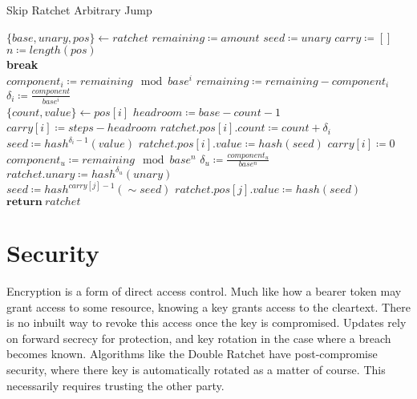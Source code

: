 \documentclass{article}
\begin{document}
	\begin{algorithm}
		\caption{Skip Ratchet Arbitrary Jump}
		\label{alg:jump}
		
		\begin{algorithmic}[1]
				\State $\{base, unary, pos\} \gets ratchet$
				\State $remaining \coloneqq amount$
				\State $seed \coloneqq unary$
				\State $carry \coloneqq []$
				\State $n \coloneqq length(pos)$
				\\
						\State \textbf{break}
					\EndIf
					\\
					\State $component_{i} \coloneqq remaining\mod{base^{i}}$
					\State $remaining \coloneqq remaining - component_{i}$
					\State $\delta_{i} \coloneqq \frac{component}{base^{i}}$ 
					\\
					\State $\{count, value\} \gets pos[i]$
					\State $headroom \coloneqq base - count - 1$
					\\
						\State $carry[i] \coloneqq steps - headroom$
					\Else
						\State $ratchet.pos[i].count \coloneqq count + \delta_{i}$
							\State $seed \coloneqq hash^{\delta_{i} - 	1}(value)$
							\State $ratchet.pos[i].value \coloneqq hash(seed)$
						\Else
							\State $carry[i] \coloneqq 0$
						\EndIf
					\EndIf
				\EndFor
				\\
					\State $component_{u} \coloneqq remaining \mod{base^{n}}$
					\State $\delta_{u} \coloneqq \frac{component_{u}}{base^{n}}$
					\State $ratchet.unary \coloneqq hash^{\delta_{u}}(unary)$
				\EndIf
				\\
				 
					\State $seed \coloneqq hash^{carry[j] - 1}(\sim{seed})$
					\State $ratchet.pos[j].value \coloneqq hash(seed)$
				\EndFor
				\\
				\State $\textbf{return}\ ratchet$
			\EndFunction
		\end{algorithmic}
	\end{algorithm}

	\section{Security}
	
	Encryption is a form of direct access control. Much like how a bearer token may grant access to some resource, knowing a key grants access to the cleartext. There is no inbuilt way to revoke this access once the key is compromised. Updates rely on forward secrecy for protection, and key rotation in the case where a breach becomes known. Algorithms like the Double Ratchet\cite{double-ratchet} have post-compromise security, where there key is automatically rotated as a matter of course. This necessarily requires trusting the other party.
		
\end{document}
